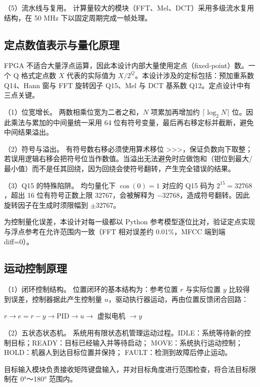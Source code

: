 \documentclass[UTF8,zihao=-4,fontset=windows]{ctexart}
\newcommand{\code}[1]{{\ttfamily #1}}
\begin{document}
{\heiti（5）流水线与复用。} 计算量较大的模块（FFT、Mel、DCT）采用多级流水复用结构，在 50 MHz 下以固定周期完成一帧处理。

\subsection{定点数值表示与量化原理}

FPGA 不适合大量浮点运算，因此本设计内部大量使用定点（fixed-point）数。一个 Q 格式定点数 $X$ 代表的实际值为 $X/2^{Q}$。本设计涉及的定标包括：预加重系数 Q14、Hann 窗与 FFT 旋转因子 Q15、Mel 与 DCT 基系数 Q12。定点设计中有三点关键。

{\heiti（1）位宽增长。} 两数相乘位宽为二者之和，$N$ 项累加再增加约 $\lceil\log_2 N\rceil$ 位。因此乘法与累加的中间量统一采用 64 位有符号变量，最后再右移定标并截断，避免中间结果溢出。

{\heiti（2）符号与溢出。} 有符号数右移必须使用算术移位 \code{>>>}，保证负数向下取整；若误用逻辑右移会把符号位当作数值。当溢出无法避免时应做饱和（钳位到最大/最小值）而不是任其回绕，因为回绕会使符号翻转，产生完全错误的结果。

{\heiti（3）Q15 的特殊陷阱。} 均匀量化下 $\cos(0)=1$ 对应的 Q15 码为 $2^{15}=32768$，超出 16 位有符号正数上限 32767，会被解释为 $-32768$，造成符号翻转。因此旋转因子在生成时须限幅到 $\pm 32767$。

为控制量化误差，本设计对每一级都以 Python 参考模型逐位比对，验证定点实现与浮点参考在允许范围内一致（FFT 相对误差约 0.01\%，MFCC 端到端 \code{diff=0}）。

\subsection{运动控制原理}

{\heiti（1）闭环控制结构。} 位置闭环的基本结构为：参考位置 $r$ 与实际位置 $y$ 比较得到误差，控制器据此产生控制量 $u$，驱动执行器运动，再由位置反馈闭合回路：

\begin{center}
$r \rightarrow e=r-y \rightarrow \mathrm{PID} \rightarrow u \rightarrow$ 虚拟电机 $\rightarrow y$
\end{center}

{\heiti（2）五状态状态机。} 系统用有限状态机管理运动过程。IDLE：系统等待新的控制目标；READY：目标已经输入并等待启动； MOVE：系统执行运动控制；HOLD：机器人到达目标位置并保持； FAULT：检测到故障后停止运动。

目标输入模块负责接收矩阵键盘输入，并对目标角度进行范围检查，将合法目标限制在 0°～180° 范围内。
\end{document}
